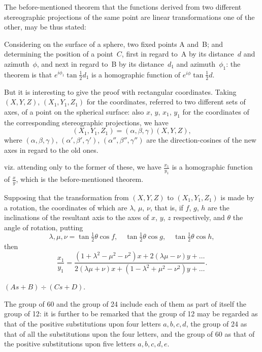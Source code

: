 \documentclass[11pt,a4paper]{book}
\begin{document}
\begin{art}
The before-mentioned theorem that the functions derived from two
different stereographic projections of the same point are linear
transformations one of the other, may be thus stated:

Considering on the surface of a sphere, two fixed points A and~B;
and determining the position of a point~$C$, first in regard to~A by its
distance~$d$ and azimuth~$\phi$, and next in regard to~B by its distance~$d_1$
and azimuth~$\phi_1$: the theorem is that $e^{i\phi_1} \tan\frac{1}{2}d_1$ is a homographic
function of $e^{i\phi} \tan\frac{1}{2}d$.
\end{art}

\begin{art}
But it is interesting to give the proof with rectangular coordinates.
Taking $(X, Y, Z)$, $(X_1, Y_1, Z_1)$ for the coordinates, referred to two
different sets of axes, of a point on the spherical surface: also $x$, $y$,
$x_1$, $y_1$ for the coordinates of the corresponding stereographic
projections, we have
\[
(X_1, Y_1, Z_1) = (\alpha, \beta, \gamma)(X, Y, Z),
\]
where $(\alpha, \beta, \gamma)$, $(\alpha', \beta', \gamma')$, $(\alpha'', \beta'', \gamma'')$ are the direction-cosines of
the new axes in regard to the old ones.
\end{art}

\begin{art}
viz. attending only to the former of these, we have $\frac{x_1}{y_1}$ is a homographic
function of $\frac{x}{y}$, which is the before-mentioned theorem.
\end{art}

\begin{art}
Supposing that the transformation from $(X, Y, Z)$ to $(X_1, Y_1, Z_1)$ is
made by a rotation, the coordinates of which are $\lambda$, $\mu$, $\nu$, that is,
if $f$, $g$, $h$ are the inclinations of the resultant axis to the axes of $x$,
$y$, $z$ respectively, and $\theta$ the angle of rotation, putting
\[
\lambda, \mu, \nu = \tan\tfrac{1}{2}\theta \cos f, \quad \tan\tfrac{1}{2}\theta \cos g, \quad \tan\tfrac{1}{2}\theta \cos h,
\]
then
\[
\frac{x_1}{y_1} = \frac{(1+\lambda^2-\mu^2-\nu^2)x + 2(\lambda\mu-\nu)y + \ldots}{2(\lambda\mu+\nu)x + (1-\lambda^2+\mu^2-\nu^2)y + \ldots}.
\]
\end{art}

\begin{art}
$(As + B) \div (Cs + D)$.

The group of 60 and the group of 24 include each of them as part of
itself the group of 12: it is further to be remarked that the group of 12
may be regarded as that of the positive substitutions upon four letters
$a, b, c, d$, the group of 24 as that of all the substitutions upon the four
letters, and the group of 60 as that of the positive substitutions upon
five letters $a, b, c, d, e$.
\end{art}
\end{document}
